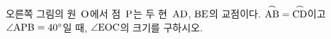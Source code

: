 \noindent\begin{minipage}[t]{0.58\linewidth}\vspace{0pt}\raggedright 오른쪽 그림의 원~$\mathrm{O}$에서 점~$\mathrm{P}$는 두 현~$\mathrm{AD}$, $\mathrm{BE}$의 교점이다. $\overset{\frown}{\mathrm{AB}}=\overset{\frown}{\mathrm{CD}}$이고 $\angle\mathrm{APB}=40^\circ$일 때, $\angle\mathrm{EOC}$의 크기를 구하시오.\end{minipage}\hfill\begin{minipage}[t]{0.4\linewidth}\vspace{0pt}\centering \resizebox{\ifdim\width>\linewidth\linewidth\else\width\fi}{!}{}\end{minipage}\par
